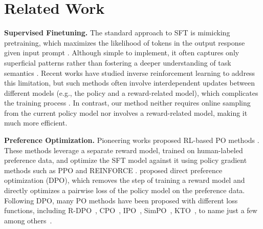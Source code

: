 \section{Related Work}
{\bf Supervised Finetuning.} The standard approach to SFT is mimicking pretraining, which maximizes the likelihood of tokens in the output response given input prompt \citep{ouyang2022training, wei2022finetuned,xu2023wizardlm,wang2023self,zhang2023instruction,li2024self}. Although simple to implement, it often captures only superficial patterns rather than fostering a deeper understanding of task semantics \citep{kung2023models, zhang2023instruction, gudibande2024the}. Recent works have studied inverse reinforcement learning to address this limitation, but such methods often involve interdependent updates between different models (e.g., the policy and a reward-related model), which complicates the training process \cite{li2024getting, wulfmeier2024imitating}. In contrast, our method neither requires online sampling from the current policy model nor involves a reward-related model, making it much more efficient.%

{\bf Preference Optimization.} Pioneering works proposed RL-based PO methods \cite{christiano2017deep,ziegler2019fine,learn2020summ,ouyang2022training,bai2022training}. These methods leverage a separate reward model, trained on human-labeled preference data, and optimize the SFT model against it using policy gradient methods such as PPO \cite{schulman2017proximal} and REINFORCE \cite{williams1992simple}.
\citet{rafailov2023direct} proposed direct preference optimization (DPO), which removes the step of training a reward model and directly optimizes a pairwise loss of the policy model on the preference data. Following DPO, many PO methods have been proposed with different loss functions, including R-DPO~\cite{Park2024DisentanglingLF}, CPO~\cite{xu2024contrastive}, IPO~\cite{ipo_2022}, SimPO~\cite{meng2024simpo}, KTO~\cite{ethayarajhmodel}, to name just a few among others~\cite{zhao2023calibrating,jung2024binaryclassifieroptimizationlarge}.  

